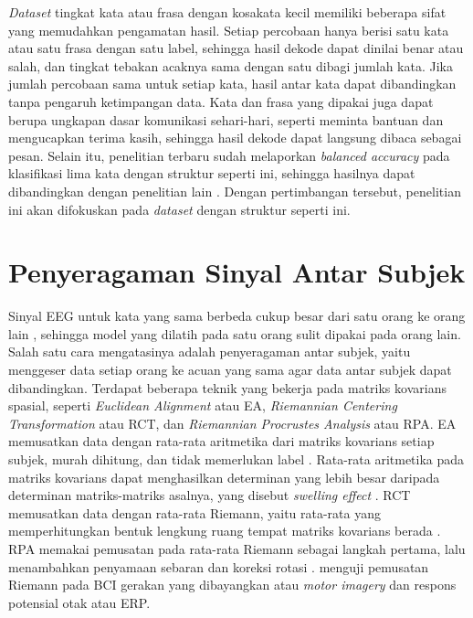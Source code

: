 \textit{Dataset} tingkat kata atau frasa dengan kosakata kecil memiliki beberapa sifat yang memudahkan pengamatan hasil.
Setiap percobaan hanya berisi satu kata atau satu frasa dengan satu label, sehingga hasil dekode dapat dinilai benar atau salah, dan tingkat tebakan acaknya sama dengan satu dibagi jumlah kata.
Jika jumlah percobaan sama untuk setiap kata, hasil antar kata dapat dibandingkan tanpa pengaruh ketimpangan data.
Kata dan frasa yang dipakai juga dapat berupa ungkapan dasar komunikasi sehari-hari, seperti meminta bantuan dan mengucapkan terima kasih, sehingga hasil dekode dapat langsung dibaca sebagai pesan.
Selain itu, penelitian terbaru sudah melaporkan \textit{balanced accuracy} pada klasifikasi lima kata dengan struktur seperti ini, sehingga hasilnya dapat dibandingkan dengan penelitian lain \parencite{zhou2025}.
Dengan pertimbangan tersebut, penelitian ini akan difokuskan pada \textit{dataset} dengan struktur seperti ini.

\section{Penyeragaman Sinyal Antar Subjek}
\label{sec:rct}
Sinyal EEG untuk kata yang sama berbeda cukup besar dari satu orang ke orang lain \parencite{duhair2026}, sehingga model yang dilatih pada satu orang sulit dipakai pada orang lain.
Salah satu cara mengatasinya adalah penyeragaman antar subjek, yaitu menggeser data setiap orang ke acuan yang sama agar data antar subjek dapat dibandingkan.
Terdapat beberapa teknik yang bekerja pada matriks kovarians spasial, seperti \textit{Euclidean Alignment} atau EA, \textit{Riemannian Centering Transformation} atau RCT, dan \textit{Riemannian Procrustes Analysis} atau RPA.
EA memusatkan data dengan rata-rata aritmetika dari matriks kovarians setiap subjek, murah dihitung, dan tidak memerlukan label \parencite{he2020}.
Rata-rata aritmetika pada matriks kovarians dapat menghasilkan determinan yang lebih besar daripada determinan matriks-matriks asalnya, yang disebut \textit{swelling effect} \parencite{arsigny2005}.
RCT memusatkan data dengan rata-rata Riemann, yaitu rata-rata yang memperhitungkan bentuk lengkung ruang tempat matriks kovarians berada \parencite{zanini2018}.
RPA memakai pemusatan pada rata-rata Riemann sebagai langkah pertama, lalu menambahkan penyamaan sebaran dan koreksi rotasi \parencite{rodrigues2019}.
\textcite{zanini2018} menguji pemusatan Riemann pada BCI gerakan yang dibayangkan atau \textit{motor imagery} dan respons potensial otak atau ERP.

